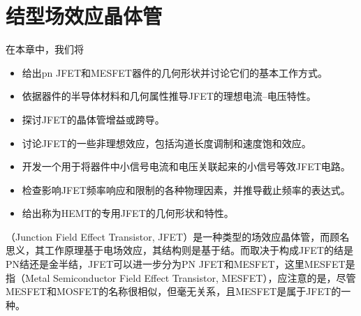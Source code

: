 \chapter{结型场效应晶体管}
在本章中，我们将
\begin{itemize}
    \item 给出pn JFET和MESFET器件的几何形状并讨论它们的基本工作方式。
    \item 依据器件的半导体材料和几何属性推导JFET的理想电流--电压特性。
    \item 探讨JFET的晶体管增益或跨导。
    \item 讨论JFET的一些非理想效应，包括沟道长度调制和速度饱和效应。
    \item 开发一个用于将器件中小信号电流和电压关联起来的小信号等效JFET电路。
    \item 检查影响JFET频率响应和限制的各种物理因素，并推导截止频率的表达式。
    \item 给出称为HEMT的专用JFET的几何形状和特性。
\end{itemize}
（Junction Field Effect Transistor, JFET）是一种类型的场效应晶体管，而顾名思义，其工作原理基于电场效应，其结构则是基于结。而取决于构成JFET的结是PN结还是金半结，JFET可以进一步分为PN JFET和MESFET，这里MESFET是指（Metal Semiconductor Field Effect Transistor, MESFET），应注意的是，尽管MESFET和MOSFET的名称很相似，但毫无关系，且MESFET是属于JFET的一种。



